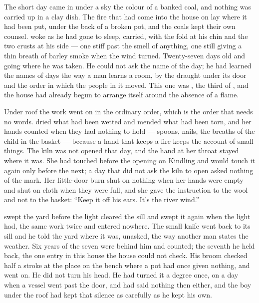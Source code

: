 
The short day came in under a sky the colour of a banked coal, and nothing was carried up  in a clay dish. The fire that had come into the house on  lay where it had been put, under the back of a broken pot, and the coals kept their own counsel.  woke as he had gone to sleep, carried, with the fold at his chin and the two crusts at his side --- one stiff past the smell of anything, one still giving a thin breath of barley smoke when the wind turned. Twenty-seven days old and going where he was taken. He could not ask the name of the day; he had learned the names of days the way a man learns a room, by the draught under its door and the order in which the people in it moved. This one was , the third of , and the house had already begun to arrange itself around the absence of a flame.

Under  roof the work went on in the ordinary order, which is the order that needs no words.  dried what had been wetted and mended what had been torn, and her hands counted when they had nothing to hold --- spoons, nails, the breaths of the child in the basket --- because a hand that keeps a fire keeps the account of small things. The kiln was not opened that day, and the hand at her throat stayed where it was. She had touched  before the opening on Kindling and would touch it again only before the next; a day that did not ask the kiln to open asked nothing of the mark. Her little-door burn shut on nothing when her hands were empty and shut on cloth when they were full, and she gave the instruction to the wool and not to the basket: “Keep it off his ears. It's the river wind.”

 swept the yard before the light cleared the sill and swept it again when the light had, the same work twice and entered nowhere. The small knife went back to its sill and he told the yard where it was, unasked, the way another man states the weather. Six years of the seven were behind him and counted; the seventh he held back, the one entry in this house the house could not check. His broom checked half a stroke at the place on the bench where a pot had once given nothing, and went on. He did not turn his head. He had turned it a degree once, on a day when a vessel went past the door, and had said nothing then either, and the boy under the roof had kept that silence as carefully as he kept his own.

